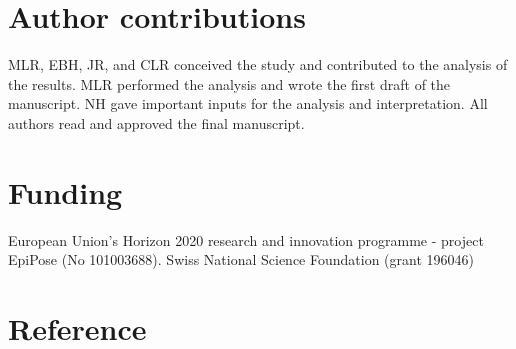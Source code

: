 \documentclass[10pt, a4paper, twoside]{article}
\begin{document}
\begin{multicols}{2}
\section{Author contributions}
MLR, EBH, JR, and CLR conceived the study and contributed to the analysis of the results. MLR performed the analysis and wrote the first draft of the manuscript. NH gave important inputs for the analysis and interpretation. All authors read and approved the final manuscript.

\section{Funding}
European Union’s Horizon 2020 research and innovation programme - project EpiPose (No 101003688). Swiss National Science Foundation (grant 196046)

\section{Reference}
\printbibliography[heading=none]

\end{multicols}

\clearpage
\end{document}
